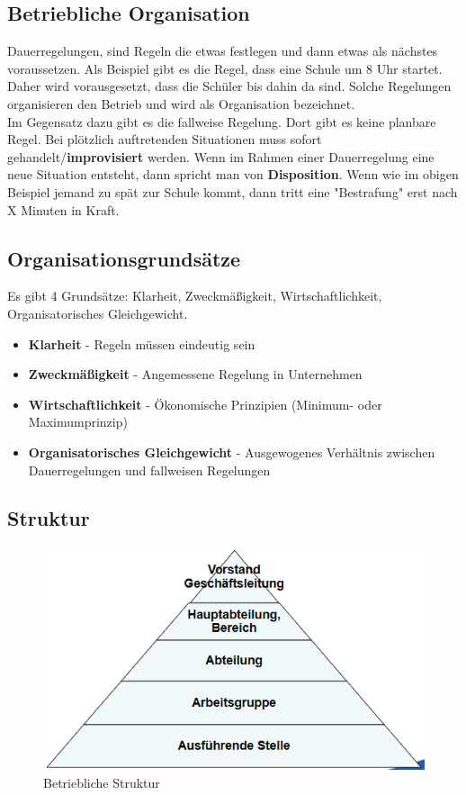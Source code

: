 \documentclass[]{article}
\begin{document}
\subsection{Betriebliche Organisation}
Dauerregelungen, sind Regeln die etwas festlegen und dann etwas als nächstes voraussetzen. Als Beispiel gibt es die Regel, dass eine Schule um 8 Uhr startet. Daher wird vorausgesetzt, dass die Schüler bis dahin da sind. Solche Regelungen organisieren den Betrieb und wird als Organisation bezeichnet. \\
Im Gegensatz dazu gibt es die fallweise Regelung. Dort gibt es keine planbare Regel. Bei plötzlich auftretenden Situationen muss sofort gehandelt/\textbf{improvisiert} werden. Wenn im Rahmen einer Dauerregelung eine neue Situation entsteht, dann spricht man von \textbf{Disposition}. Wenn wie im obigen Beispiel jemand zu spät zur Schule kommt, dann tritt eine "Bestrafung" erst nach X Minuten in Kraft.

\subsection{Organisationsgrundsätze}
Es gibt 4 Grundsätze: Klarheit, Zweckmäßigkeit, Wirtschaftlichkeit, Organisatorisches Gleichgewicht.
\begin{itemize}
	\item \textbf{Klarheit} - Regeln müssen eindeutig sein
	\item \textbf{Zweckmäßigkeit} - Angemessene Regelung in Unternehmen
	\item \textbf{Wirtschaftlichkeit} - Ökonomische Prinzipien (Minimum- oder Maximumprinzip)
	\item \textbf{Organisatorisches Gleichgewicht} - Ausgewogenes Verhältnis zwischen Dauerregelungen und fallweisen Regelungen
\end{itemize}

\subsection{Struktur}

\begin{figure}[h]
	\centering
	\includegraphics[width=0.7\linewidth]{assetes/Struktur}
	\caption{Betriebliche Struktur}
	\label{fig:struktur}
\end{figure}
\end{document}

